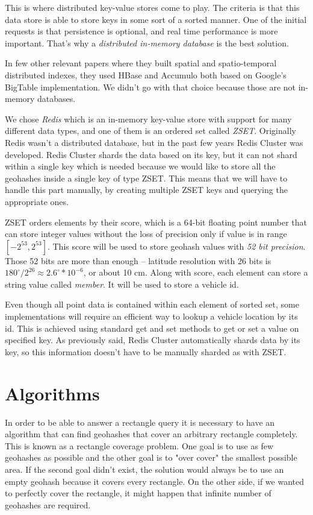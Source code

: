 \documentclass[times, utf8, diplomski]{fer}
\begin{document}
This is where distributed key-value stores come to play. The criteria is that this data store is able to store keys in some sort of a sorted manner. One of the initial requests is that persistence is optional, and real time performance is more important. That's why a \emph{distributed in-memory database} is the best solution.

In few other relevant papers where they built spatial \cite{spatialindex} and spatio-temporal \cite{spatiotemporal} distributed indexes, they used HBase and Accumulo both based on Google's BigTable implementation. We didn't go with that choice because those are not in-memory databases.

We chose \emph{Redis} which is an in-memory key-value store with support for many different data types, and one of them is an ordered set called \emph{ZSET}. Originally Redis wasn't a distributed database, but in the past few years Redis Cluster was developed. Redis Cluster shards the data based on its key, but it can not shard within a single key which is needed because we would like to store all the geohashes inside a single key of type ZSET. This means that we will have to handle this part manually, by creating multiple ZSET keys and querying the appropriate ones.

ZSET orders elements by their score, which is a 64-bit floating point number that can store integer values without the loss of precision only if value is in range $[-2^{53}, 2^{53}]$. This score will be used to store geohash values with \emph{52 bit precision}. Those 52 bits are more than enough -- latitude resolution with 26 bits is $180^{\circ}/2^{26} \approx 2.6^{\circ}*10^{-6}$, or about 10 cm. Along with score, each element can store a string value called \emph{member}. It will be used to store a vehicle id.

Even though all point data is contained within each element of sorted set, some implementations will require an efficient way to lookup a vehicle location by its id. This is achieved using standard get and set methods to get or set a value on specified key. As previously said, Redis Cluster automatically shards data by its key, so this information doesn't have to be manually sharded as with ZSET.

\chapter {Algorithms} \label {algorithms}
In order to be able to answer a rectangle query it is necessary to have an algorithm that can find geohashes that cover an arbitrary rectangle completely. This is known as a rectangle coverage problem. One goal is to use as few geohashes as possible and the other goal is to "over cover" the smallest possible area. If the second goal didn't exist, the solution would always be to use an empty geohash because it covers every rectangle. On the other side, if we wanted to perfectly cover the rectangle, it might happen that infinite number of geohashes are required.
\end{document}
